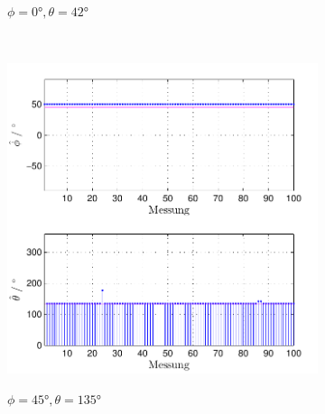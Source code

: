 \begin{figure}
\begin{subfigure}[b]{0.48\textwidth}
                \label{fig:Foto_DSP_Draufsicht}
                \caption{$\phi=0°, \theta = 42°$}
        \end{subfigure}
        ~ %
        \begin{subfigure}[b]{0.48\textwidth}
                \centering
                \includegraphics[width=\textwidth]{images/04_Echtzeitversuch/MALE_Phi_45_Theta_135}
                \label{fig:Foto_DSP_Draufsicht}
                \caption{$\phi=45°, \theta = 135°$}
        \end{subfigure}
        ~ %
        \begin{subfigure}[b]{0.48\textwidth}
                \centering

\end{subfigure}
\end{figure}
